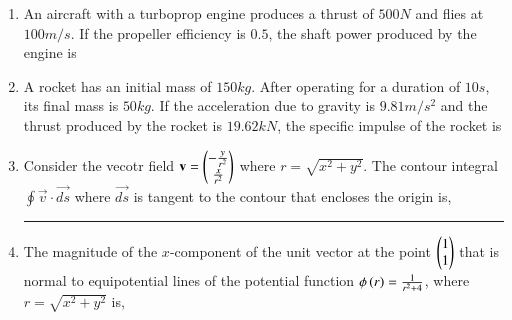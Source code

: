 \documentclass[journal]{IEEEtran}
\begin{document}
\begin{enumerate}
\begin{enumerate}
\end{enumerate}
\item An aircraft with a turboprop engine produces a thrust of $500 N$ and flies at $100 m/s$. If the propeller efficiency is $0.5$, the shaft power produced by the engine is 
	\begin{enumerate}
\end{enumerate}
\item A rocket has an initial mass of $150 kg$. After operating for a duration of $10 s$, its final mass is $50 kg$. If the acceleration due to gravity is $9.81 m/s^2$ and the thrust produced by the rocket is $19.62 kN$, the specific impulse of the rocket is
	\begin{enumerate}
\end{enumerate}
\item Consider the vecotr field $\mathbf{v}=\begin{pmatrix}-\frac{y}{r^2} \\ \frac{x}{r^2}\end{pmatrix}$ where $r= \sqrt{x^2+y^2}$. The contour integral $ \oint \vec{v} \cdot \vec{ds}$ where $\vec{ds}$ is tangent to the contour that encloses the origin is, \rule{2cm}{0.2pt} 
\item The magnitude of the $x$-component of the unit vector at the point $\begin{pmatrix}1\\1\end{pmatrix}$ that is normal to equipotential lines of the potential function $\phi\left(r\right)=\frac{1}{r^2+4}$, where $r=\sqrt{x^2+y^2}$ is,

\end{enumerate}
\end{document}
